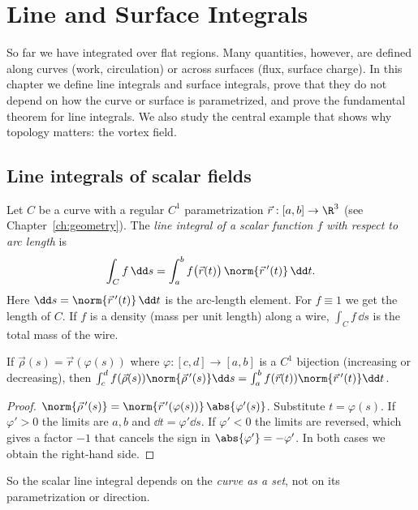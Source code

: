 \chapter{Line and Surface Integrals}
\label{ch:linesurface}

So far we have integrated over flat regions. Many quantities, however, are defined along curves (work, circulation) or across surfaces (flux, surface charge). In this chapter we define line integrals and surface integrals, prove that they do not depend on how the curve or surface is parametrized, and prove the fundamental theorem for line integrals. We also study the central example that shows why topology matters: the vortex field.

\section{Line integrals of scalar fields}

Let $C$ be a curve with a regular $C^1$ parametrization $\vec r:[a,b]\to\R^3$ (see Chapter~\ref{ch:geometry}). The \emph{line integral of a scalar function $f$ with respect to arc length} is
\[
\int_Cf\,\dd s=\int_a^bf\bigl(\vec r(t)\bigr)\,\norm{\vec r\,'(t)}\,\dd t .
\]
Here $\dd s=\norm{\vec r\,'(t)}\,\dd t$ is the arc-length element. For $f\equiv1$ we get the length of $C$. If $f$ is a density (mass per unit length) along a wire, $\int_Cf\,\dd s$ is the total mass of the wire.

\begin{proposition}\label{prop:lineparam}
If $\vec\rho(s)=\vec r(\varphi(s))$ where $\varphi:[c,d]\to[a,b]$ is a $C^1$ bijection (increasing or decreasing), then $\int_c^df(\vec\rho(s))\norm{\vec\rho\,'(s)}\dd s=\int_a^bf(\vec r(t))\norm{\vec r\,'(t)}\dd t$.
\end{proposition}

\begin{proof}
$\norm{\vec\rho\,'(s)}=\norm{\vec r\,'(\varphi(s))}\,\abs{\varphi'(s)}$. Substitute $t=\varphi(s)$. If $\varphi'>0$ the limits are $a,b$ and $\dd t=\varphi'\dd s$. If $\varphi'<0$ the limits are reversed, which gives a factor $-1$ that cancels the sign in $\abs{\varphi'}=-\varphi'$. In both cases we obtain the right-hand side.
\end{proof}

So the scalar line integral depends on the \emph{curve as a set}, not on its parametrization or direction.


